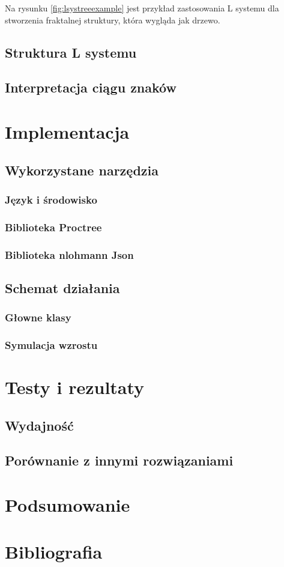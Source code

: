 \documentclass[a4paper,12pt,oneside]{book} %
\begin{document}
Na rysunku \ref{fig:lsystreeexample} jest przykład zastosowania L systemu dla stworzenia 
fraktalnej struktury, która wygląda jak drzewo.



\section{Struktura L systemu}

\section{Interpretacja ciągu znaków}

\chapter{Implementacja} 

\section{Wykorzystane narzędzia}

\subsection{Język i środowisko}

\subsection{Biblioteka Proctree}

\subsection{Biblioteka nlohmann Json}

\section{Schemat działania}

\subsection{Głowne klasy}

\subsection{Symulacja wzrostu}

\chapter{Testy i rezultaty}

\section{Wydajność}
\section{Porównanie z innymi rozwiązaniami}

\chapter{Podsumowanie}

\chapter{Bibliografia}
\end{document}
